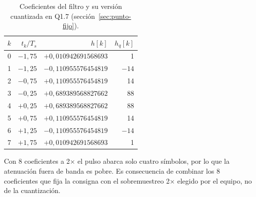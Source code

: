 \begin{table}[h]
  \centering
  \caption{Coeficientes del filtro y su versión cuantizada en Q1.7 (sección~\ref{sec:punto-fijo}).}\label{tab:coef}
  \begin{tabular}{rrrr}
    \toprule
    $k$ & $t_k/T_s$ & $h[k]$ & $h_q[k]$ \\
    \midrule
    0 & $-1{,}75$ & $+0{,}010942691568693$ & 1 \\
    1 & $-1{,}25$ & $-0{,}110955576454819$ & $-14$ \\
    2 & $-0{,}75$ & $+0{,}110955576454819$ & 14 \\
    3 & $-0{,}25$ & $+0{,}689389568827662$ & 88 \\
    4 & $+0{,}25$ & $+0{,}689389568827662$ & 88 \\
    5 & $+0{,}75$ & $+0{,}110955576454819$ & 14 \\
    6 & $+1{,}25$ & $-0{,}110955576454819$ & $-14$ \\
    7 & $+1{,}75$ & $+0{,}010942691568693$ & 1 \\
    \bottomrule
  \end{tabular}
\end{table}

Con 8 coeficientes a 2× el pulso abarca solo cuatro símbolos, por lo que la atenuación fuera de banda es pobre. Es consecuencia de combinar los 8 coeficientes que fija la consigna con el sobremuestreo 2× elegido por el equipo, no de la cuantización.
